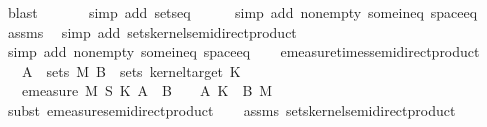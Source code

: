 \begin{isabellebody}
\ blast\isanewline
\ \ \ \ \ \isamarkupfalse%
\ {\isacharparenleft}{\kern0pt}simp\ add{\isacharcolon}{\kern0pt}\ sets{\isacharunderscore}{\kern0pt}eq{\isacharparenright}{\kern0pt}\isanewline
\ \ \ \ \isamarkupfalse%
\ {\isacharparenleft}{\kern0pt}simp\ add{\isacharcolon}{\kern0pt}\ nonempty\ some{\isacharunderscore}{\kern0pt}in{\isacharunderscore}{\kern0pt}eq\ space{\isacharunderscore}{\kern0pt}eq{\isacharparenright}{\kern0pt}\isanewline
\ \ \isamarkupfalse%
\ assms\ \isamarkupfalse%
\ {\isacharparenleft}{\kern0pt}simp\ add{\isacharcolon}{\kern0pt}\ sets{\isacharunderscore}{\kern0pt}kernel{\isacharunderscore}{\kern0pt}semidirect{\isacharunderscore}{\kern0pt}product{\isacharparenright}{\kern0pt}\isanewline
\ \ \isamarkupfalse%
\ {\isacharparenleft}{\kern0pt}simp\ add{\isacharcolon}{\kern0pt}\ nonempty\ some{\isacharunderscore}{\kern0pt}in{\isacharunderscore}{\kern0pt}eq\ space{\isacharunderscore}{\kern0pt}eq{\isacharparenright}{\kern0pt}\isanewline
\ \ \isamarkupfalse%
%
\endisatagproof
{\isafoldproof}%
%
\isadelimproof
%
\endisadelimproof
\isanewline
\isanewline
{}\isamarkupfalse%
\ emeasure{\isacharunderscore}{\kern0pt}times{\isacharunderscore}{\kern0pt}semidirect{\isacharunderscore}{\kern0pt}product{\isacharcolon}{\kern0pt}\ \isanewline
\ \ \ {\isachardoublequoteopen}A\ {\isasymin}\ sets\ M{\isachardoublequoteclose}\ {\isachardoublequoteopen}B\ {\isasymin}\ sets\ {\isacharparenleft}{\kern0pt}kernel{\isacharunderscore}{\kern0pt}target\ K{\isacharparenright}{\kern0pt}{\isachardoublequoteclose}\isanewline
\ \ \ {\isachardoublequoteopen}emeasure\ {\isacharparenleft}{\kern0pt}M\ {\isasymOtimes}\isactrlsub S\ K{\isacharparenright}{\kern0pt}\ {\isacharparenleft}{\kern0pt}A\ {\isasymtimes}\ B{\isacharparenright}{\kern0pt}\ {\isacharequal}{\kern0pt}\ {\isasymintegral}\isactrlsup {\isacharplus}{\kern0pt}{\isasymomega}\ {\isasymin}\ A{\isachardot}{\kern0pt}\ K\ {\isasymomega}\ B\ {\isasympartial}M{\isachardoublequoteclose}\isanewline
%
\isadelimproof
\ \ %
\endisadelimproof
%
\isatagproof
{}\isamarkupfalse%
\ {\isacharparenleft}{\kern0pt}subst\ emeasure{\isacharunderscore}{\kern0pt}semidirect{\isacharunderscore}{\kern0pt}product{\isacharparenright}{\kern0pt}\isanewline
\ \ \isamarkupfalse%
\ assms\ sets{\isacharunderscore}{\kern0pt}kernel{\isacharunderscore}{\kern0pt}semidirect{\isacharunderscore}{\kern0pt}product\ \isamarkupfalse%

\end{isabellebody}
